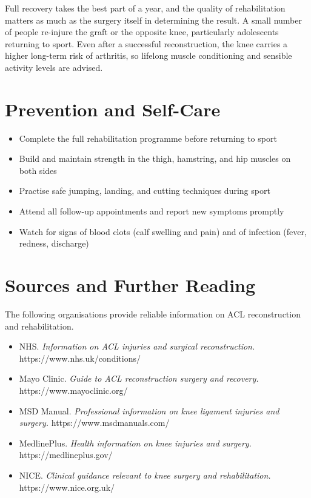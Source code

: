 Full recovery takes the best part of a year, and the quality of rehabilitation matters as much as the surgery itself in determining the result. A small number of people re-injure the graft or the opposite knee, particularly adolescents returning to sport. Even after a successful reconstruction, the knee carries a higher long-term risk of arthritis, so lifelong muscle conditioning and sensible activity levels are advised.

\section*{Prevention and Self-Care}
\begin{itemize}
    \item Complete the full rehabilitation programme before returning to sport
    \item Build and maintain strength in the thigh, hamstring, and hip muscles on both sides
    \item Practise safe jumping, landing, and cutting techniques during sport
    \item Attend all follow-up appointments and report new symptoms promptly
    \item Watch for signs of blood clots (calf swelling and pain) and of infection (fever, redness, discharge)
\end{itemize}

\section*{Sources and Further Reading}
The following organisations provide reliable information on ACL reconstruction and rehabilitation.

\begin{itemize}
    \item NHS. \textit{Information on ACL injuries and surgical reconstruction.} https://www.nhs.uk/conditions/
    \item Mayo Clinic. \textit{Guide to ACL reconstruction surgery and recovery.} https://www.mayoclinic.org/
    \item MSD Manual. \textit{Professional information on knee ligament injuries and surgery.} https://www.msdmanuals.com/
    \item MedlinePlus. \textit{Health information on knee injuries and surgery.} https://medlineplus.gov/
    \item NICE. \textit{Clinical guidance relevant to knee surgery and rehabilitation.} https://www.nice.org.uk/
\end{itemize}
